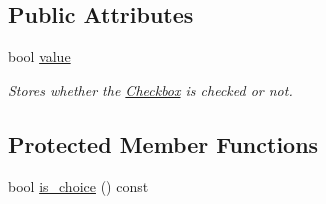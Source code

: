 \subsection*{Public Attributes}
\begin{DoxyCompactItemize}
\item 
\mbox{\label{class_checkbox_ac423af3bf4b58bc68ce79392ce11b291}} 
bool \mbox{\hyperlink{class_checkbox_ac423af3bf4b58bc68ce79392ce11b291}{value}}
\begin{DoxyCompactList}\small\item\em Stores whether the \mbox{\hyperlink{class_checkbox}{Checkbox}} is checked or not. \end{DoxyCompactList}\end{DoxyCompactItemize}
\subsection*{Protected Member Functions}
\begin{DoxyCompactItemize}
\item 
bool \mbox{\hyperlink{class_checkbox_a7d468fd5e0d9be7eeb498f511fa23f16}{is\+\_\+choice}} () const
\end{DoxyCompactItemize}
